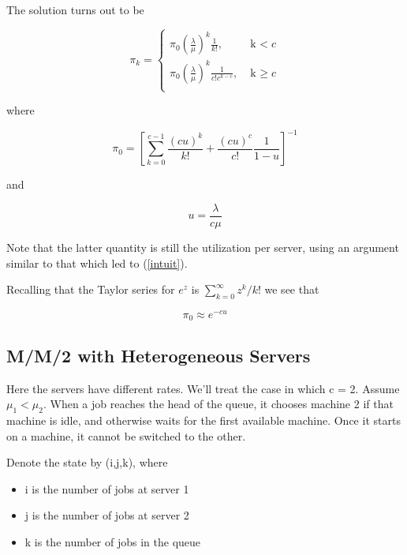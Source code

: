 The solution turns out to be

\begin{equation}
\pi_k = \begin{cases}
   \pi_0 {(\frac{\lambda}{\mu})}^k \frac{1}{k!}, & \text{k $<$} c\\
   \pi_0 {(\frac{\lambda}{\mu})}^k \frac{1}{c!c^{k-c}}, & \text{k $\geq$} c\\
\end{cases}
\end{equation}

where

\begin{equation}
\pi_0 = \left [ 
\sum_{k=0}^{c-1} \frac{{(c u)}^k}{k!} + \frac{{(c u)}^c}{c!}
\frac{1}{1-u} 
\right ] ^ {-1}
\end{equation}

and

\begin{equation}
u = \frac{\lambda}{c \mu}
\end{equation}

Note that the latter quantity is still the utilization per server, using
an argument similar to that which led to (\ref{intuit}).  

Recalling that the Taylor series for $e^z$ is $\sum_{k=0}^{\infty} 
z^k/k!$ we see that 

\begin{equation}
\pi_0 \approx e^{-c u}  
\end{equation}

\subsection{M/M/2 with Heterogeneous Servers}

Here the servers have different rates.  We'll treat the case in which c
= 2.  Assume $\mu_1 < \mu_2$.  When a job reaches the head of the queue,
it chooses machine 2 if that machine is idle, and otherwise waits for
the first available machine.  Once it starts on a machine, it cannot be
switched to the other.

Denote the state by (i,j,k), where

\begin{itemize}

\item i is the number of jobs at server 1 

\item j is the number of jobs at server 2

\item k is the number of jobs in the queue

\end{itemize}

